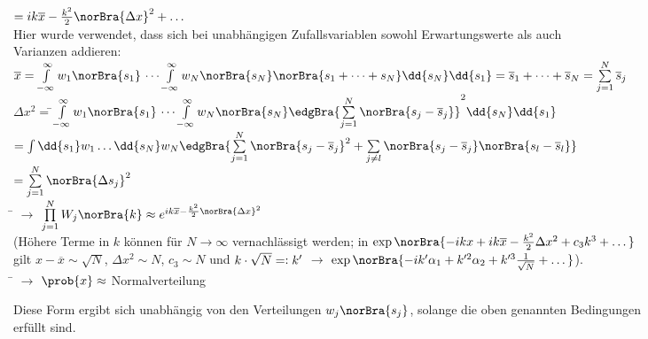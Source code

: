 \begin{tabbing}
\>$=i k \overline{x} - \frac{k^2}{2}\norBra{\Delta x}^2 + \dots$\\
Hier wurde verwendet, dass sich bei unabhängigen Zufallsvariablen sowohl Erwartungswerte als auch\\
Varianzen addieren:\\
$\overline{x}=\int\limits_{-\infty}^{\infty}w_1\norBra{s_1}\ \dots \int\limits_{-\infty}^{\infty} w_N\norBra{s_N} \norBra{s_1 + \dots + s_N} \dd{s_N} \dd{s_1} = \overline{s}_1 + \dots + \overline{s}_N = \sum\limits_{j=1}^N\overline{s}_j$\\
$\Delta x^2 =$\=$ \int\limits_{-\infty}^{\infty}w_1\norBra{s_1}\ \dots \int\limits_{-\infty}^{\infty} w_N\norBra{s_N} \edgBra{\sum\limits_{j=1}^N \norBra{s_j-\overline{s}_j}}^2 \dd{s_N} \dd{s_1}$\\
\>$=\int\dd{s_1}w_1\dots\dd{s_N}w_N\edgBra{\sum\limits_{j=1}^N \norBra{s_j-\overline{s}_j}^2 + \sum\limits_{j\neq l}\norBra{s_j-\overline{s}_j}\norBra{s_l-\overline{s}_l}}$\\
$=\sum\limits_{j=1}^N \norBra{\Delta s_j}^2$\\
\hspace{4em} \= \kill
$\rightarrow$\> $\prod\limits_{j=1}^N W_j\norBra{k} \approx e^{i k \overline{x} - \frac{k^2}{2}\norBra{\Delta x}^2}$\\
(Höhere Terme in $k$ können für $N\to\infty$ vernachlässigt werden; in $\exp\norBra{-i k x + i k \overline{x} - \frac{k^2}{2} \Delta x^2 + c_3 k^3 + \dots}$\\
gilt $x-\overline{x} \sim \sqrt{N}$, $\Delta x^2 \sim N$, $c_3\sim N$ und $k\cdot \sqrt{N} =\vcentcolon k'$ $\rightarrow$ $\exp\norBra{- i k' \alpha_1 + k'^2 \alpha_2 + k'^3 \frac{1}{\sqrt{N}}+\dots}$).\\
\hspace{4em} \= \kill
$\rightarrow$\> $\prob{x}\approx$ Normalverteilung
\end{tabbing}
\begin{figure}[H]
  \centering
\end{figure}
\begin{tabbing}
Diese Form ergibt sich unabhängig von den Verteilungen $w_j\norBra{s_j}$, solange die oben genannten Bedingungen\\ erfüllt sind.
\end{tabbing}


